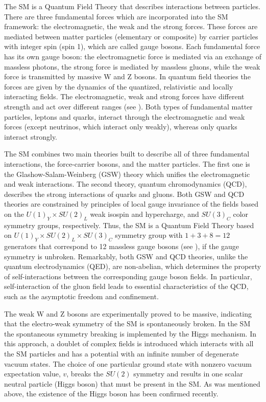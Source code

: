 The SM is a Quantum Field Theory that describes interactions between particles.
There are three fundamental forces which are incorporated into the SM framework: the electromagnetic, the weak and the strong forces. These forces are mediated between matter particles (elementary or composite) by carrier particles with integer spin (spin 1), which are called gauge bosons.
Each fundamental force has its own gauge boson: the electromagnetic force is mediated via an exchange of massless photons, the strong force is mediated by massless gluons, while the weak force is transmitted by massive W and Z bosons.
In quantum field theories the forces are given by the dynamics of the quantized, relativistic and locally interacting fields.
The electromagnetic, weak and strong forces have different strength and act over different ranges (see ). 
Both types of fundamental matter particles, leptons and quarks, interact through the electromagnetic and weak forces (except neutrinos, which interact only weakly), whereas only quarks interact strongly.

The SM combines two main theories built to describe all of three fundamental interactions, the force-carrier bosons, and the matter particles. The first one is the Glashow-Salam-Weinberg (GSW) theory which unifies the electromagnetic and weak interactions. The second theory, quantum chromodynamics (QCD), describes the strong interactions of quarks and gluons. Both GSW and QCD theories are constrained by principles of local gauge invariance of the fields based on the $U(1)_Y\times SU(2)_{L}$ weak isospin and hypercharge, and $SU(3)_C$ color symmetry groups, respectively. Thus, the SM is a Quantum Field Theory based on $U(1)_Y\times SU(2)_{L}\times SU(3)_C$ symmetry group with $1+3+8=12$ generators that correspond to 12 massless gauge bosons (see ), if the gauge symmetry is unbroken. 
Remarkably, both GSW and QCD theories, unlike the quantum electrodynamics (QED), are non-abelian, which determines the property of self-interactions between the corresponding gauge boson fields. In particular, self-interaction of the gluon field leads to essential characteristics of the QCD, such as the asymptotic freedom and confinement.

The weak W and Z bosons are experimentally proved to be massive, indicating that the electro-weak symmetry of the SM is spontaneously broken. 
In the SM the spontaneous symmetry breaking is implemented by the Higgs mechanism. In this approach,
a doublet of complex fields is introduced which interacts with all the SM particles and has a potential with an infinite number of degenerate vacuum states. 
The choice of one particular ground state with nonzero vacuum expectation value, $v$, breaks the $SU(2)$ symmetry and results in one scalar neutral particle (Higgs boson) that must be present in the SM. As was mentioned above, the existence of the Higgs boson has been confirmed recently.

